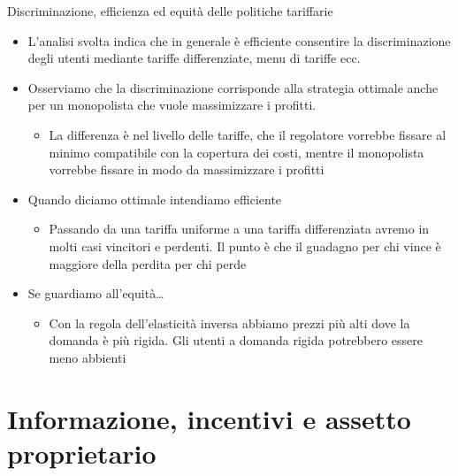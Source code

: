 \documentclass[aspectratio=64,11pt]{beamer}
\begin{document}
\begin{frame}{Discriminazione, efficienza ed equità delle politiche tariffarie}
\begin{itemize}
\item L'analisi svolta indica che in generale è efficiente consentire la
discriminazione degli utenti mediante tariffe differenziate, menu di tariffe
ecc.
\item Osserviamo che la discriminazione corrisponde alla strategia ottimale anche
per un monopolista che vuole massimizzare i profitti.
\begin{itemize}
\item La differenza è nel \alert{livello} delle tariffe, che il regolatore vorrebbe
fissare al minimo compatibile con la copertura dei costi, mentre il
monopolista vorrebbe fissare in modo da massimizzare i profitti
\end{itemize}
\item Quando diciamo \alert{ottimale} intendiamo \alert{efficiente}
\begin{itemize}
\item Passando da una tariffa uniforme a una tariffa differenziata avremo in
molti casi vincitori e perdenti. Il punto è che il guadagno per chi vince
è maggiore della perdita per chi perde
\end{itemize}
\item Se guardiamo all'equità\ldots{}
\begin{itemize}
\item Con la regola dell'elasticità inversa abbiamo prezzi più alti dove la domanda è più rigida. Gli utenti a domanda rigida potrebbero essere meno abbienti
\end{itemize}
\end{itemize}
\end{frame}

\section{Informazione, incentivi e assetto proprietario}
\end{document}
